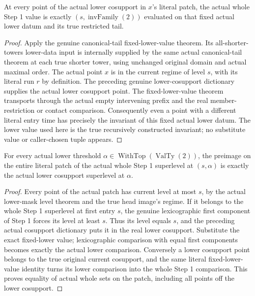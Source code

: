 \begin{lemma}
\label{hir:dimension-three-fixed-lower-value}
\leanok
At every point of the actual lower cosupport in $x$'s literal patch, the
actual whole Step 1 value is exactly $(s,\operatorname{invFamily}(2))$
evaluated on that fixed actual lower datum and its true restricted tail.
\end{lemma}
\begin{proof}
Apply the genuine canonical-tail fixed-lower-value theorem. Its
all-shorter-towers lower-data input is internally supplied by the same
actual canonical-tail theorem at each true shorter tower, using unchanged
original domain and actual maximal order. The actual point $x$ is in the
current regime of level $s$, with its literal run $r$ by definition.
The preceding genuine lower-cosupport dictionary supplies the actual
lower cosupport point. The fixed-lower-value theorem transports through
the actual empty intervening prefix and the real member-restriction or
contact comparison. Consequently even a point with a different literal
entry time has precisely the invariant of this fixed actual lower datum.
The lower value used here is the true recursively constructed invariant;
no substitute value or caller-chosen tuple appears.
\end{proof}

\begin{theorem}
\label{hir:dimension-three-fixed-lower-threshold-dictionary}
\leanok
For every actual lower threshold $\alpha\in\operatorname{WithTop}(\operatorname{ValTy}(2))$,
the preimage on the entire literal patch of the actual whole Step 1
superlevel at $(s,\alpha)$ is exactly the actual lower cosupport
superlevel at $\alpha$.
\end{theorem}
\begin{proof}
Every point of the actual patch has current level at most $s$, by the
actual lower-mask level theorem and the true head image's regime. If it
belongs to the whole Step 1 superlevel at first entry $s$, the genuine
lexicographic first component of Step 1 forces its level at least $s$.
Thus its level equals $s$, and the preceding actual cosupport dictionary
puts it in the real lower cosupport. Substitute the exact fixed-lower
value; lexicographic comparison with equal first components becomes
exactly the actual lower comparison. Conversely a lower cosupport point
belongs to the true original current cosupport, and the same literal
fixed-lower-value identity turns its lower comparison into the whole
Step 1 comparison. This proves equality of actual whole sets on the patch,
including all points off the lower cosupport.
\end{proof}

